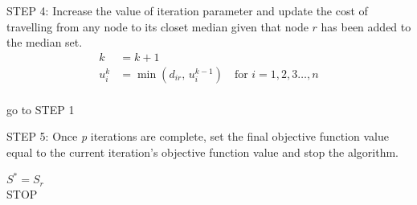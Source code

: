 \documentclass[11pt]{article}
\begin{document}
\begin{algorithm}
\begin{algorithmic}[0]
		
		\Statex
		\Statex STEP 4: Increase the value of iteration parameter and update the cost of travelling from any node to its closet median given that node $r$ has been added to the median set.
		\begin{align*}
			k &= k+1\\
			u_i^k &= \min(d_{ir} \text{, } u_i^{k-1}) \quad \text{for } i = 1,2,3 \dots,n\\
		\end{align*}
		
		\Statex go to STEP 1
		\EndIf
		
		\Statex
		\Statex STEP 5: Once \emph{p} iterations are complete, set the final objective function value equal to the current iteration's objective function value and stop the algorithm.
		\begin{center}
			$S^{*} = S_r$\\
			STOP
		\end{center}
		
	\end{algorithmic}
\end{algorithm}

\end{document}
